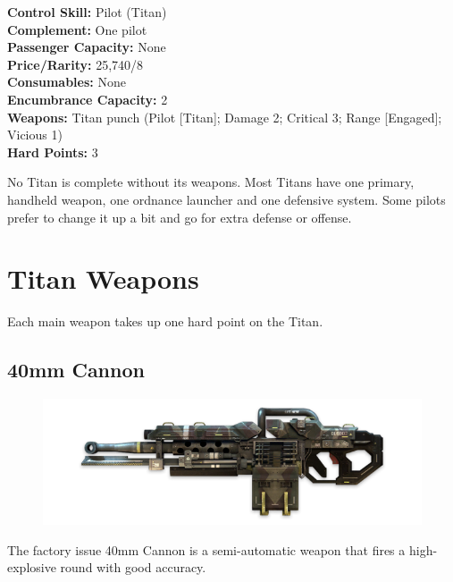 \documentclass[9pt, openany]{extbook}
\begin{document}


\begin{multicols}{2}
\noindent\textbf{Control Skill:} Pilot (Titan)\\
\noindent\textbf{Complement:} One pilot\\
\noindent\textbf{Passenger Capacity:} None\\
\noindent\textbf{Price/Rarity:} 25,740/8\\
\noindent\textbf{Consumables:} None\\
\noindent\textbf{Encumbrance Capacity:} 2\\
\noindent\textbf{Weapons:} Titan punch (Pilot [Titan]; Damage 2; Critical 3; Range [Engaged]; Vicious 1)\\
\noindent\textbf{Hard Points:} 3
\end{multicols}



No Titan is complete without its weapons. Most Titans have one primary, handheld weapon, one ordnance launcher and one defensive system. Some pilots prefer to change it up a bit and go for extra defense or offense. 

\section{Titan Weapons}

Each main weapon takes up one hard point on the Titan.

\subsection{40mm Cannon}

\begin{figure}
\vspace*{-2em}
\includegraphics[width=\linewidth]{40mmCannon}
\end{figure}

The factory issue 40mm Cannon is a semi-automatic weapon that fires a high-explosive round with good accuracy. 
\end{document}

